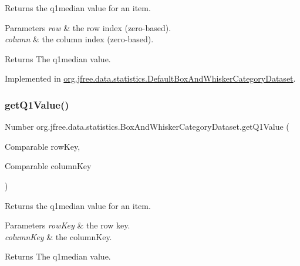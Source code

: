 Returns the q1median value for an item.


\begin{DoxyParams}{Parameters}
{\em row} & the row index (zero-\/based). \\
\hline
{\em column} & the column index (zero-\/based).\\
\hline
\end{DoxyParams}
\begin{DoxyReturn}{Returns}
The q1median value. 
\end{DoxyReturn}


Implemented in \mbox{\hyperlink{classorg_1_1jfree_1_1data_1_1statistics_1_1_default_box_and_whisker_category_dataset_a4b862aaed6798d006e261389b4a2c63b}{org.\+jfree.\+data.\+statistics.\+Default\+Box\+And\+Whisker\+Category\+Dataset}}.

\mbox{\label{interfaceorg_1_1jfree_1_1data_1_1statistics_1_1_box_and_whisker_category_dataset_aed1b5795f0cd902a998e9abb82eb8556}} 
\subsubsection{\texorpdfstring{get\+Q1\+Value()}{getQ1Value()}\hspace{0.1cm}{\footnotesize\ttfamily [2/2]}}
{\footnotesize\ttfamily Number org.\+jfree.\+data.\+statistics.\+Box\+And\+Whisker\+Category\+Dataset.\+get\+Q1\+Value (\begin{DoxyParamCaption}\item[{Comparable}]{row\+Key,  }\item[{Comparable}]{column\+Key }\end{DoxyParamCaption})}

Returns the q1median value for an item.


\begin{DoxyParams}{Parameters}
{\em row\+Key} & the row key. \\
\hline
{\em column\+Key} & the column\+Key.\\
\hline
\end{DoxyParams}
\begin{DoxyReturn}{Returns}
The q1median value. 
\end{DoxyReturn}


